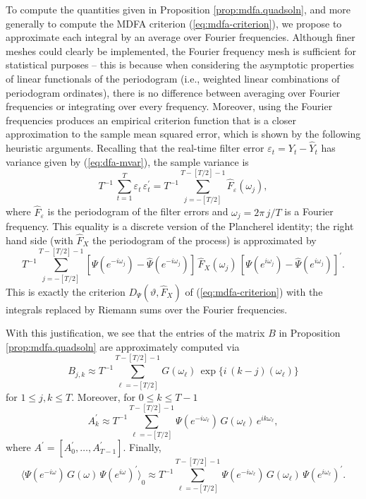 \documentclass[a4paper]{book}
\begin{document}
To compute the quantities given in Proposition \ref{prop:mdfa.quadsoln}, and more
 generally to compute the MDFA criterion (\ref{eq:mdfa-criterion}), we propose 
 to approximate each integral by an average over Fourier frequencies.  
 Although finer meshes could clearly be implemented, the Fourier frequency mesh
 is sufficient for statistical purposes -- this is because when considering
 the asymptotic properties of linear functionals of the periodogram (i.e.,
 weighted linear combinations of periodogram ordinates), there is no difference
 between averaging over Fourier frequencies or integrating over every frequency.
 Moreover, using the Fourier frequencies produces an empirical criterion function
 that is a closer approximation to the sample mean squared error, which is shown
 by the following heuristic arguments.  Recalling that the real-time filter error
 $\varepsilon_t = Y_t - \widehat{Y}_t$ has variance given by (\ref{eq:dfa-mvar}), the sample 
 variance is
\[
  T^{-1} \, \sum_{t=1}^T \varepsilon_t \, \varepsilon_t^{\prime} = T^{-1} \sum_{j=-[T/2]}^{T-[T/2]-1}   \widehat{F}_{\varepsilon} (\omega_{j}),
\]
 where $  \widehat{F}_{\varepsilon}$ is the periodogram of the filter errors and $\omega_j = 2 \pi \, j/T $ is
 a Fourier frequency.    This equality
 is a discrete version of the Plancherel identity; the right hand side
 (with $ \widehat{F}_X$ the periodogram of the process)  is approximated  by 
\[
 T^{-1} \sum_{j=-[T/2]}^{T-[T/2]-1}  \left[ \Psi (e^{-i \omega_{j} }) - \widehat{\Psi} (e^{-i \omega_{j} }) \right] \,
     \widehat{F}_X (\omega_{j}) \,
 {\left[ \Psi (e^{i \omega_{j} }) - \widehat{\Psi}( e^{i \omega_{j} }) \right]}^{\prime}.
\]
   This is exactly the   criterion $D_{\Psi} (\vartheta,  \widehat{F}_X)$ of
 (\ref{eq:mdfa-criterion}) with the integrals replaced by Riemann
 sums over the Fourier frequencies.

With this justification, we see that the entries of the matrix $B$ in 
 Proposition \ref{prop:mdfa.quadsoln} are approximately computed via
\[
  B_{j,k} \approx T^{-1} \sum_{\ell=-[T/2]}^{T-[T/2]-1} G (\omega_{\ell}) \,
   \exp \{ i \, (k-j) (\omega_{\ell}) \}
\]
 for $1 \leq j,k \leq T$.  Moreover, for $0 \leq k \leq T-1$
\[
  A_k^{\prime} \approx T^{-1}  \sum_{\ell=-[T/2]}^{T-[T/2]-1} \Psi 
	( e^{ -i \omega_{\ell} }) \,     G (\omega_{\ell}) \,
   e^{ i  k \omega_{\ell} },
\]
 where $A^{\prime} = [ A_0^{\prime}, \ldots, A_{T-1}^{\prime} ]$.  Finally,
\[
  { \langle \Psi (e^{-i \omega}) \, G (\omega)  \, { \Psi (e^{i \omega}) }^{\prime} \rangle }_0 \approx
  T^{-1}  \sum_{\ell=-[T/2]}^{T-[T/2]-1}  \Psi 
	( e^{ -i  \omega_{\ell} } ) \,
     G (\omega_{\ell}) \,  {\Psi  ( e^{ i \omega_{\ell} } ) }^{\prime}.
\]
 
\end{document}
